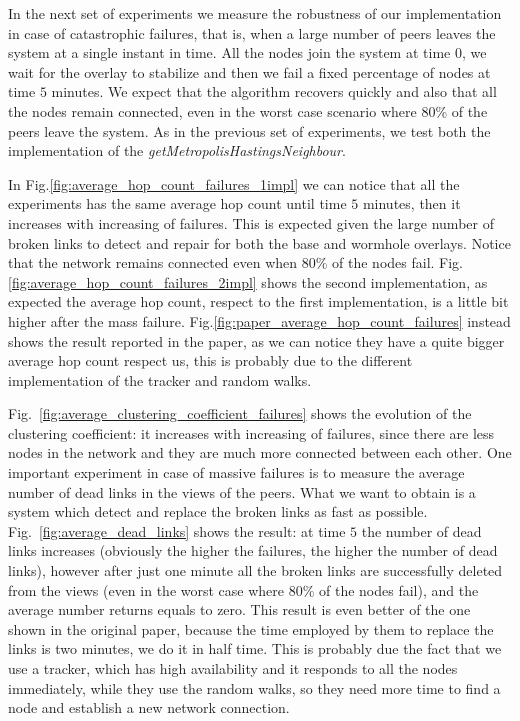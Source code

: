 In the next set of experiments we measure the robustness of our implementation in case of catastrophic failures, that is, when a large number of peers leaves the system at a single instant in time. All the nodes join the system at time $0$, we wait for the overlay to stabilize and then we fail a fixed percentage of nodes at time $5$ minutes. We expect that the algorithm recovers quickly and also that all the nodes remain connected, even in the worst case scenario where 80\% of the peers leave the system. As in the previous set of experiments, we test both the implementation of the \textit{getMetropolisHastingsNeighbour}.

In Fig.\ref{fig:average_hop_count_failures_1impl} we can notice that all the experiments has the same average hop count until time $5$ minutes, then it increases with increasing of failures. This is expected given the large number of broken links to detect and repair for both the base and wormhole overlays. Notice that the network remains connected even when 80\% of the nodes fail. Fig.\ref{fig:average_hop_count_failures_2impl} shows the second implementation, as expected the average hop count, respect to the first implementation, is a little bit higher after the mass failure. Fig.\ref{fig:paper_average_hop_count_failures} instead shows the result reported in the paper, as we can notice they have a quite bigger average hop count respect us, this is probably due to the different implementation of the tracker and random walks.

Fig.~\ref{fig:average_clustering_coefficient_failures} shows the evolution of the clustering coefficient: it increases with increasing of failures, since there are less nodes in the network and they are much more connected between each other. One important experiment in case of massive failures is to measure the average number of dead links in the views of the peers. What we want to obtain is a system which detect and replace the broken links as fast as possible. Fig.~\ref{fig:average_dead_links} shows the result: at time $5$ the number of dead links increases (obviously the higher the failures, the higher the number of dead links), however after just one minute all the broken links are successfully deleted from the views (even in the worst case where 80\% of the nodes fail), and the average number returns equals to zero. This result is even better of the one shown in the original paper, because the time employed by them to replace the links is two minutes, we do it in half time. This is probably due the fact that we use a tracker, which has high availability and it responds to all the nodes immediately, while they use the random walks, so they need more time to find a node and establish a new network connection.


